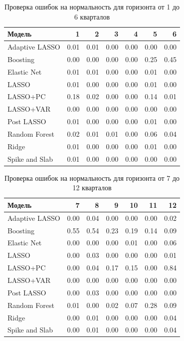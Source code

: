 \begin{table}[ht]
\centering
\caption{Проверка ошибок на нормальность для горизонта от 1 до 6 кварталов}
\label{tab:er1}
\begin{tabular}{lrrrrrr}
  \hline
Модель & 1 & 2 & 3 & 4 & 5 & 6 \\ 
  \hline
Adaptive LASSO & 0.01 & 0.01 & 0.00 & 0.00 & 0.00 & 0.00 \\ 
  Boosting & 0.00 & 0.00 & 0.00 & 0.00 & 0.25 & 0.45 \\ 
  Elastic Net & 0.01 & 0.01 & 0.00 & 0.00 & 0.01 & 0.00 \\ 
  LASSO & 0.01 & 0.00 & 0.00 & 0.00 & 0.01 & 0.00 \\ 
  LASSO+PC & 0.18 & 0.02 & 0.00 & 0.00 & 0.14 & 0.01 \\ 
  LASSO+VAR & 0.00 & 0.00 & 0.00 & 0.00 & 0.00 & 0.00 \\ 
  Post LASSO & 0.01 & 0.00 & 0.00 & 0.00 & 0.01 & 0.00 \\ 
  Random Forest & 0.02 & 0.01 & 0.01 & 0.00 & 0.06 & 0.04 \\ 
  Ridge & 0.01 & 0.00 & 0.00 & 0.00 & 0.01 & 0.00 \\ 
  Spike and Slab & 0.01 & 0.00 & 0.00 & 0.00 & 0.00 & 0.00 \\ 
   \hline
\end{tabular}
\end{table}


\begin{table}[ht]
\centering
\caption{Проверка ошибок на нормальность для горизонта от 7 до 12 кварталов}
\label{tab:er2}
\begin{tabular}{lrrrrrr}
  \hline
Модель & 7 & 8 & 9 & 10 & 11 & 12 \\ 
  \hline
Adaptive LASSO & 0.00 & 0.04 & 0.00 & 0.00 & 0.00 & 0.02 \\ 
  Boosting & 0.55 & 0.54 & 0.23 & 0.19 & 0.14 & 0.09 \\ 
  Elastic Net & 0.00 & 0.00 & 0.00 & 0.01 & 0.00 & 0.06 \\ 
  LASSO & 0.00 & 0.03 & 0.00 & 0.00 & 0.00 & 0.01 \\ 
  LASSO+PC & 0.00 & 0.04 & 0.17 & 0.15 & 0.00 & 0.84 \\ 
  LASSO+VAR & 0.00 & 0.00 & 0.00 & 0.00 & 0.00 & 0.00 \\ 
  Post LASSO & 0.00 & 0.03 & 0.00 & 0.00 & 0.00 & 0.00 \\ 
  Random Forest & 0.01 & 0.00 & 0.02 & 0.07 & 0.28 & 0.09 \\ 
  Ridge & 0.00 & 0.01 & 0.00 & 0.00 & 0.00 & 0.04 \\ 
  Spike and Slab & 0.00 & 0.01 & 0.00 & 0.00 & 0.00 & 0.04 \\ 
   \hline
\end{tabular}
\end{table}


